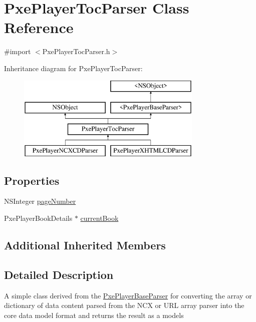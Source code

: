 \hypertarget{interface_pxe_player_toc_parser}{\section{Pxe\-Player\-Toc\-Parser Class Reference}
\label{interface_pxe_player_toc_parser}
}


{\ttfamily \#import $<$Pxe\-Player\-Toc\-Parser.\-h$>$}

Inheritance diagram for Pxe\-Player\-Toc\-Parser\-:\begin{figure}[H]
\begin{center}
\leavevmode
\includegraphics[height=4.000000cm]{interface_pxe_player_toc_parser}
\end{center}
\end{figure}
\subsection*{Properties}
\begin{DoxyCompactItemize}
\item 
N\-S\-Integer \hyperlink{interface_pxe_player_toc_parser_a4b7effc62fd499caf2df1fbd7a82b264}{page\-Number}
\item 
Pxe\-Player\-Book\-Details $\ast$ \hyperlink{interface_pxe_player_toc_parser_af92fc7c7e30af7e59a5d660d29ad7a02}{current\-Book}
\end{DoxyCompactItemize}
\subsection*{Additional Inherited Members}


\subsection{Detailed Description}
A simple class derived from the \hyperlink{protocol_pxe_player_base_parser-p}{Pxe\-Player\-Base\-Parser} for converting the array or dictionary of data content parsed from the N\-C\-X or U\-R\-L array parser into the core data model format and returns the result as a models 

